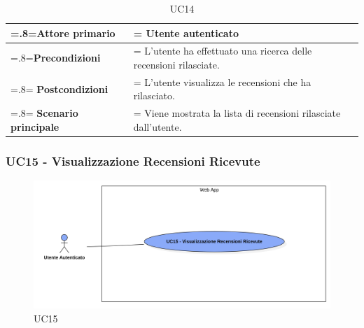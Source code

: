             \begin{table}[H]
                \centering
                \renewcommand{\arraystretch}{1.8}
                \renewcommand\tabularxcolumn[1]{m{#1}}
                \begin{tabularx}{0.9\textwidth} {
                    >{\hsize=.8\hsize\linewidth=\hsize}X
                    >{\hsize=1.2\hsize\linewidth=\hsize}X}
                    \hline
                    \textbf{Attore primario} & Utente autenticato \\
                    \hline
                    \textbf{Precondizioni} & L'utente ha effettuato una ricerca delle recensioni rilasciate. \\
                    \hline
                    \textbf{Postcondizioni} & L'utente visualizza le recensioni che ha rilasciato. \\
                    \hline
                    \textbf{Scenario principale} & Viene mostrata la lista di recensioni rilasciate dall'utente. \\
                    \hline
                \end{tabularx}
                \caption{UC14}
            \end{table}

        \subsubsection{UC15 - Visualizzazione Recensioni Ricevute}
        \label{UC15}

            \begin{figure}[H]
                \centering
                \includegraphics[scale=0.4]{src/img/UC15.png}
                \caption{UC15}
            \end{figure}

